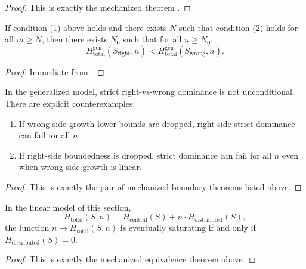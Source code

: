 \begin{proof}
This is exactly the mechanized theorem
.
\end{proof}

\begin{corollary}\label{cor:generalized-eventual-dominance}
If condition (1) above holds and there exists $N$ such that condition (2) holds for all $m\ge N$, then there exists $N_0$ such that for all $n\ge N_0$,
\[
H_{\text{total}}^{\mathrm{gen}}(S_{\mathrm{right}},n)
<
H_{\text{total}}^{\mathrm{gen}}(S_{\mathrm{wrong}},n).
\]
\end{corollary}

\begin{proof}
Immediate from
.
\end{proof}

\begin{proposition}\label{prop:generalized-assumption-boundary}
In the generalized model, strict right-vs-wrong dominance is not unconditional. There are explicit counterexamples:
\begin{enumerate}
\item If wrong-side growth lower bounds are dropped, right-side strict dominance can fail for all $n$.
\item If right-side boundedness is dropped, strict dominance can fail for all $n$ even when wrong-side growth is linear.
\end{enumerate}
\end{proposition}

\begin{proof}
This is exactly the pair of mechanized boundary theorems listed above.
\end{proof}

\begin{theorem}\label{thm:linear-saturation-iff-zero}
In the linear model of this section,
\[
H_{\text{total}}(S,n)=H_{\text{central}}(S)+n\cdot H_{\text{distributed}}(S),
\]
the function $n\mapsto H_{\text{total}}(S,n)$ is eventually saturating if and only if $H_{\text{distributed}}(S)=0$.
\end{theorem}

\begin{proof}
This is exactly the mechanized equivalence theorem above.
\end{proof}

